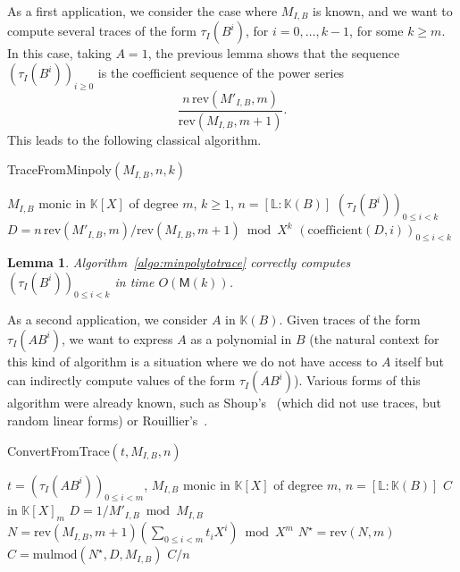 \documentclass[12pt]{article}
\def\M {\ensuremath{\mathsf{M}}}
\def\K {\ensuremath{\mathbb{K}}}
\def\L {\ensuremath{\mathbb{L}}}
\def\coeff {\ensuremath{\mathrm{coefficient}}}
\def\mulmod {\ensuremath{\mathrm{mulmod}}}
\def\rev {\ensuremath{\mathrm{rev}}}
\newtheorem{Lemma}{Lemma}
\begin{document}
As a first application, we consider the case where $M_{I,B}$ is known,
and we want to compute several traces of the form $\tau_I(B^i)$, for
$i=0,\dots,k-1$, for some $k \ge m$. In this case, taking $A=1$, the
previous lemma shows that the sequence $(\tau_I(B^i))_{i \ge 0}$ is
the coefficient sequence of the power series
  $$ \frac{n\, \rev(M'_{I,B} ,m)}{\rev(M_{I,B},m+1)}.$$ This leads to
the following classical algorithm.

\begin{algorithm}[H]
  \caption{TraceFromMinpoly$(M_{I,B}, n, k)$}
  \begin{algorithmic}[1]
    \REQUIRE  $M_{I,B}$ monic in $\K[X]$ of degree $m$, $k \ge 1$, $n=[\L:\K(B)]$    
    \ENSURE $(\tau_I(B^i))_{0 \le i < k}$
    \STATE\label{algo:minpolytotrace:1} $D = n\, \rev(M'_{I,B}, m)/\rev(M_{I,B}, m+1) \bmod X^k$
    \RETURN $(\coeff(D,i))_{0 \le i < k}$
  \end{algorithmic}
  \label{algo:minpolytotrace}
\end{algorithm}

\begin{Lemma}\label{lemma:computetrace}
  Algorithm~\ref{algo:minpolytotrace} correctly computes
  $(\tau_I(B^i))_{0 \le i < k}$ in time $O(\M(k))$.
\end{Lemma}

As a second application, we consider $A$ in $\K(B)$. Given traces of
the form $\tau_I(A B^i)$, we want to express $A$ as a polynomial in
$B$ (the natural context for this kind of algorithm is a situation
where we do not have access to $A$ itself but can indirectly compute
values of the form $\tau_I(A B^i)$). Various forms of this algorithm
were already known, such as Shoup's~\cite{shoup94} (which did not use
traces, but random linear forms) or Rouillier's~\cite{rouiller99}.

\begin{algorithm}[H]
  \caption{ConvertFromTrace$(t, M_{I,B}, n)$}
  \begin{algorithmic}[1]
    \REQUIRE  $t=(\tau_I(A B^i))_{0 \le i < m}$, $M_{I,B}$ monic in $\K[X]$ of degree $m$, $n=[\L:\K(B)]$
    \ENSURE $C$ in $\K[X]_m$
    \STATE $D =  1/M'_{I,B} \bmod M_{I,B}$
    \STATE $N=\rev(M_{I,B}, m+1)( \sum_{0 \le i <m} t_i X^i) \bmod X^m$
    \STATE $N^\star = \rev(N, m)$
    \STATE $C=\mulmod(N^\star, D, M_{I,B})$
    \RETURN $C/n$
  \end{algorithmic}
  \label{algo:tracetopoly}
\end{algorithm}
\end{document}
